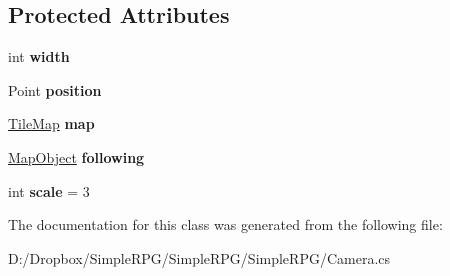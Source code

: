 \subsection*{Protected Attributes}
\begin{DoxyCompactItemize}
\item 
\hypertarget{class_simple_r_p_g_1_1_camera_ab0fea3d111b817fcb7f838b4648c4657}{int {\bfseries width}}\label{class_simple_r_p_g_1_1_camera_ab0fea3d111b817fcb7f838b4648c4657}

\item 
\hypertarget{class_simple_r_p_g_1_1_camera_ae1387580f2a0ebd55db53956c6dd13e5}{Point {\bfseries position}}\label{class_simple_r_p_g_1_1_camera_ae1387580f2a0ebd55db53956c6dd13e5}

\item 
\hypertarget{class_simple_r_p_g_1_1_camera_a1641f20a80724c541768c011ad2764dd}{\hyperlink{class_simple_r_p_g_1_1_tile_map}{Tile\+Map} {\bfseries map}}\label{class_simple_r_p_g_1_1_camera_a1641f20a80724c541768c011ad2764dd}

\item 
\hypertarget{class_simple_r_p_g_1_1_camera_aca69b516daceee441b7720ada3c332e4}{\hyperlink{class_simple_r_p_g_1_1_map_object}{Map\+Object} {\bfseries following}}\label{class_simple_r_p_g_1_1_camera_aca69b516daceee441b7720ada3c332e4}

\item 
\hypertarget{class_simple_r_p_g_1_1_camera_a107cbdb4e731179affca5292ea1b2a4a}{int {\bfseries scale} = 3}\label{class_simple_r_p_g_1_1_camera_a107cbdb4e731179affca5292ea1b2a4a}

\end{DoxyCompactItemize}


The documentation for this class was generated from the following file\+:\begin{DoxyCompactItemize}
\item 
D\+:/\+Dropbox/\+Simple\+R\+P\+G/\+Simple\+R\+P\+G/\+Simple\+R\+P\+G/Camera.\+cs\end{DoxyCompactItemize}
